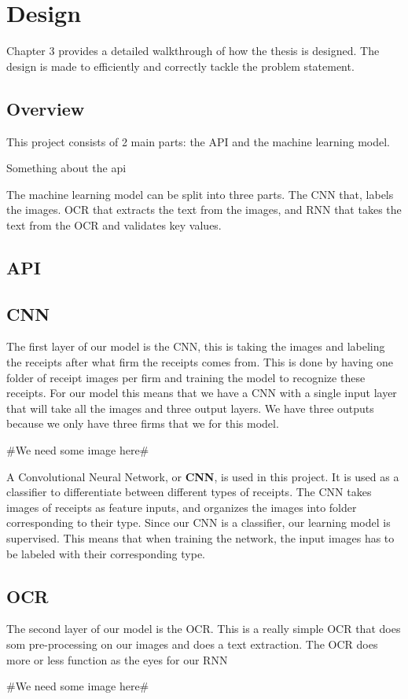 \chapter{Design}
\label{ch:design}
Chapter 3 provides a detailed walkthrough of how the thesis is designed.
The design is made to efficiently and correctly tackle the problem statement.


\section{Overview}\label{sec:Overview}

This project consists of 2 main parts: the API and the machine learning model.

Something about the api

The machine learning model can be split into three parts.
The CNN that, labels the images.
OCR that extracts the text from the images, and RNN that takes the text from the OCR and validates key values.


\section{API}\label{sec:API}


\section{CNN}\label{sec:CNN}

The first layer of our model is the CNN, this is taking the images and labeling the receipts after what firm the receipts comes from.
This is done by having one folder of receipt images per firm and training the model to recognize these receipts.
For our model this means that we have a CNN with a single input layer that will take all the images and three output layers.
We have three outputs because we only have three firms that we for this model.

#We need some image here#

A Convolutional Neural Network, or \textbf{CNN}, is used in this project.
It is used as a classifier to differentiate between different types of receipts.
The CNN takes images of receipts as feature inputs, and organizes the images into folder corresponding to their type.
Since our CNN is a classifier, our learning model is supervised.
This means that when training the network, the input images has to be labeled with their corresponding type.

\section{OCR}\label{sec:OCR}

The second layer of our model is the OCR. This is a really simple OCR that does som pre-processing on our images and does a text extraction.
The OCR does more or less function as the eyes for our RNN

#We need some image here#